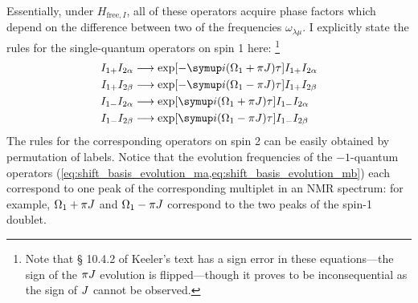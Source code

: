 Essentially, under $H_{\text{free},I}$, all of these operators acquire phase factors which depend on the difference between two of the frequencies $\omega_{\lambda\mu}$.
I explicitly state the rules for the single-quantum operators on spin 1 here:%
\footnote{Note that \S{} 10.4.2 of Keeler's text\autocite{Keeler2010} has a sign error in these equations---the sign of the $\pi J\/$ evolution is flipped---though it proves to be inconsequential as the sign of $J\/$ cannot be observed.}
\begin{align}
    I_{1+}I_{2\alpha} &\longrightarrow \exp[-\mi(\Omega_1 + \pi J)\tau] I_{1+}I_{2\alpha} \label{eq:shift_basis_evolution_pa} \\
    I_{1+}I_{2\beta} &\longrightarrow \exp[-\mi(\Omega_1 - \pi J)\tau] I_{1+}I_{2\beta} \label{eq:shift_basis_evolution_pb} \\
    I_{1-}I_{2\alpha} &\longrightarrow \exp[\mi(\Omega_1 + \pi J)\tau] I_{1-}I_{2\alpha} \label{eq:shift_basis_evolution_ma} \\
    I_{1-}I_{2\beta} &\longrightarrow \exp[\mi(\Omega_1 - \pi J)\tau] I_{1-}I_{2\beta} \label{eq:shift_basis_evolution_mb}
\end{align}
The rules for the corresponding operators on spin 2 can be easily obtained by permutation of labels.
Notice that the evolution frequencies of the $-1$-quantum operators (\cref{eq:shift_basis_evolution_ma,eq:shift_basis_evolution_mb}) each correspond to one peak of the corresponding multiplet in an NMR spectrum: for example, $\Omega_1 + \pi J\/$ and $\Omega_1 - \pi J\/$ correspond to the two peaks of the spin-1 doublet.

